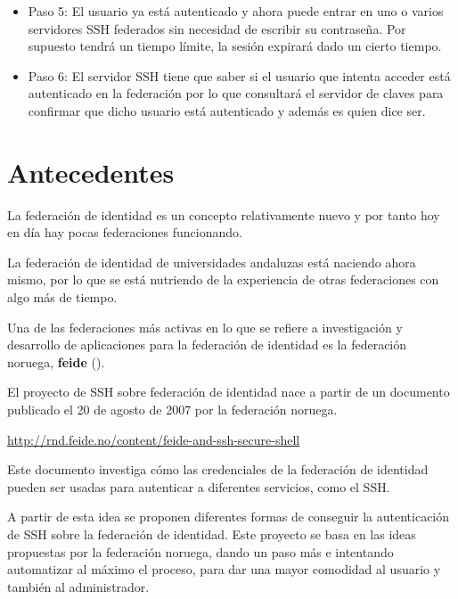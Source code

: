 \begin{itemize}
        \item{Paso 5:} El usuario ya está autenticado y ahora puede
        entrar en uno o varios servidores SSH federados sin necesidad de
        escribir su contraseña. Por supuesto tendrá un tiempo límite,
        la sesión expirará dado un cierto tiempo.

        \item{Paso 6:} El servidor SSH tiene que saber si el usuario
        que intenta acceder está autenticado en la federación por lo
        que consultará el servidor de claves para confirmar que dicho
        usuario está autenticado y además es quien dice ser.

    \end{itemize}

\newpage
\section{Antecedentes}

    La federación de identidad es un concepto relativamente nuevo y
    por tanto hoy en día hay pocas federaciones funcionando.

    La federación de identidad de universidades andaluzas está
    naciendo ahora mismo, por lo que se está nutriendo de la
    experiencia de otras federaciones con algo más de tiempo.

    Una de las federaciones más activas en lo que se refiere a
    investigación y desarrollo de aplicaciones para la federación de
    identidad es la federación noruega, \textbf{feide} (\cite{feide}).

    El proyecto de SSH sobre federación de identidad nace a partir de
    un documento publicado el 20 de agosto de 2007 por la federación
    noruega.

    \href{http://rnd.feide.no/content/feide-and-ssh-secure-shell}{http://rnd.feide.no/content/feide-and-ssh-secure-shell}

    Este documento investiga cómo las credenciales de la federación
    de identidad pueden ser usadas para autenticar a diferentes
    servicios, como el SSH.

    A partir de esta idea se proponen diferentes formas de conseguir
    la autenticación de SSH sobre la federación de identidad.
    Este proyecto se basa en las ideas propuestas por la federación
    noruega, dando un paso más e intentando automatizar al máximo el
    proceso, para dar una mayor comodidad al usuario y también al
    administrador.

